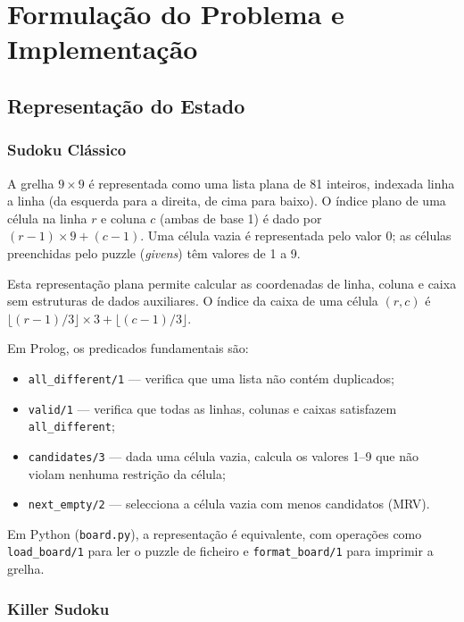 %
%
\chapter{Formulação do Problema e Implementação}
\label{cha:formulacao}

\section{Representação do Estado}
\label{sec:representacao}

\subsection{Sudoku Clássico}
\label{ssec:rep_classico}

A grelha $9 \times 9$ é representada como uma lista plana de 81 inteiros, indexada linha a linha (da esquerda para a direita, de cima para baixo). O índice plano de uma célula na linha $r$ e coluna $c$ (ambas de base 1) é dado por $(r-1) \times 9 + (c-1)$. Uma célula vazia é representada pelo valor $0$; as células preenchidas pelo puzzle (\emph{givens}) têm valores de 1 a 9.

Esta representação plana permite calcular as coordenadas de linha, coluna e caixa sem estruturas de dados auxiliares. O índice da caixa de uma célula $(r, c)$ é $\lfloor(r-1)/3\rfloor \times 3 + \lfloor(c-1)/3\rfloor$.

Em Prolog, os predicados fundamentais são:
\begin{itemize}
    \item \texttt{all\_different/1} — verifica que uma lista não contém duplicados;
    \item \texttt{valid/1} — verifica que todas as linhas, colunas e caixas satisfazem \texttt{all\_different};
    \item \texttt{candidates/3} — dada uma célula vazia, calcula os valores 1--9 que não violam nenhuma restrição da célula;
    \item \texttt{next\_empty/2} — selecciona a célula vazia com menos candidatos (MRV).
\end{itemize}

Em Python (\texttt{board.py}), a representação é equivalente, com operações como \texttt{load\_board/1} para ler o puzzle de ficheiro e \texttt{format\_board/1} para imprimir a grelha.

\subsection{Killer Sudoku}
\label{ssec:rep_killer}


